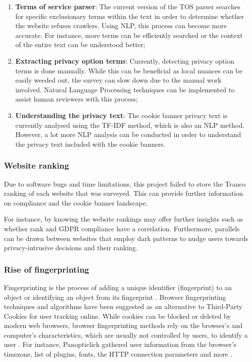 \documentclass[../main.tex]{subfiles}
\begin{document}
\begin{enumerate}
    \item \textbf{Terms of service parser}: The current version of the TOS parser searches for specific exclusionary terms within the text in order to determine whether the website refuses crawlers. Using NLP, this process can become more accurate. For instance, more terms can be efficiently searched or the context of the entire text can be understood better;

    \item \textbf{Extracting privacy option terms}: Currently, detecting privacy option terms is done manually. While this can be beneficial as local nuances can be easily weeded out, the survey can slow down due to the manual work involved. Natural Language Processing techniques can be implemented to assist human reviewers with this process;

    \item \textbf{Understanding the privacy text}: The cookie banner privacy text is currently analysed using the TF-IDF method, which is also an NLP method. However, a lot more NLP analysis can be conducted in order to understand the privacy text included with the cookie banners. 
\end{enumerate}

\subsubsection{Website ranking}
Due to software bugs and time limitations, this project failed to store the Tranco ranking of each website that was surveyed. This can provide further information on compliance and the cookie banner landscape.

For instance, by knowing the website rankings may offer further insights such as whether rank and GDPR compliance have a correlation. Furthermore, parallels can be drawn between websites that employ dark patterns to nudge users towards privacy-intrusive decisions and their ranking.

\subsubsection{Rise of fingerprinting}
Fingerprinting is the process of adding a unique identifier (fingerprint) to an object or identifying an object from its fingerprint \cite{wagner1983fingerprinting}. Browser fingerprinting techniques and algorithms have been suggested as an alternative to Third-Party Cookies for user tracking online. While cookies can be blocked or deleted by modern web browsers, browser fingerprinting methods rely on the browser’s and computer’s characteristics, which are usually not controlled by users, to identify a user \cite{boda2011user}. For instance, Panopticlick gathered user information from the browser’s timezone, list of plugins, fonts, the HTTP connection parameters and more \cite{eckersley2010unique}.
\end{document}
